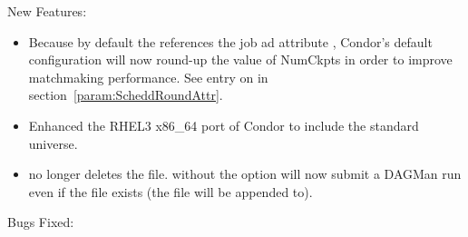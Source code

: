 \noindent New Features:

\begin{itemize}

\item Because by default the  references the job
ad attribute , Condor's default configuration
will now round-up the value of NumCkpts in order to improve 
matchmaking performance.  See entry on 
in section~\ref{param:ScheddRoundAttr}.

\item Enhanced the RHEL3 x86\_64 port of Condor to include the standard
universe.

\item {}  no longer deletes the
 file.   without the 
option will now submit a DAGMan run even if the 
file exists (the file will be appended to).

\end{itemize}

\noindent Bugs Fixed:

